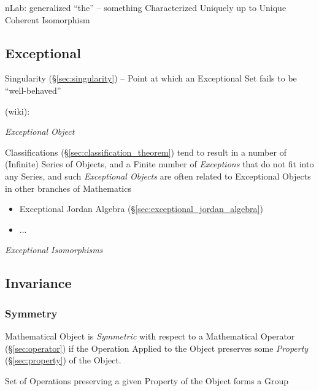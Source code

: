nLab: generalized ``the'' -- something Characterized Uniquely up to
Unique Coherent Isomorphism %



\subsection{Exceptional}\label{sec:exceptional}

\fist Singularity (\S\ref{sec:singularity}) -- Point at which an Exceptional Set
fails to be ``well-behaved''

(wiki):

\emph{Exceptional Object}

Classifications (\S\ref{sec:classification_theorem}) tend to result in a number
of (Infinite) Series of Objects, and a Finite number of \emph{Exceptions} that
do not fit into any Series, and such \emph{Exceptional Objects} are often
related to Exceptional Objects in other branches of Mathematics

\begin{itemize}
  \item Exceptional Jordan Algebra (\S\ref{sec:exceptional_jordan_algebra})
  \item ...
\end{itemize}

\emph{Exceptional Isomorphisms}



\subsection{Invariance}\label{sec:invariance}

\subsubsection{Symmetry}\label{sec:symmetry}

Mathematical Object is \emph{Symmetric} with respect to a Mathematical Operator
(\S\ref{sec:operator}) if the Operation Applied to the Object preserves some
\emph{Property} (\S\ref{sec:property}) of the Object.

Set of Operations preserving a given Property of the Object forms a
Group %

